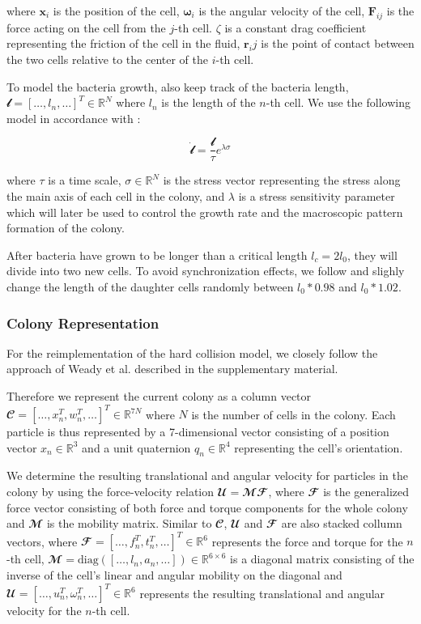 \documentclass[conference]{IEEEtran}
\begin{document}
where $\mathbf{x}_i$ is the position of the cell, $\mathbf{\omega}_i$ is the angular velocity of the cell, $\mathbf{F}_{ij}$ is the force acting on the cell from the $j$-th cell. $\zeta$ is a constant drag coefficient representing the friction of the cell in the fluid, $\mathbf{r}_ij$ is the point of contact between the two cells relative to the center of the $i$-th cell.


To model the bacteria growth, also keep track of the bacteria length, $\mathbfcal{l} = [\dots, l_n, \dots]^T \in \mathbb{R}^{N}$ where $l_n$ is the length of the $n$-th cell. We use the following model in accordance with \cite{Weady2024}:

$$
    \dot{\mathbfcal{l}} =  \frac{\mathbfcal{l}}{\tau} e^{\lambda \mathbfcal{\sigma}}
$$

where $\tau$ is a time scale, $\mathbfcal{\sigma} \in \mathbb{R}^{N}$ is the stress vector representing the stress along the main axis of each cell in the colony, and $\lambda$ is a stress sensitivity parameter which will later be used to control the growth rate and the macroscopic pattern formation of the colony.

After bacteria have grown to be longer than a critical length $l_c = 2l_0$, they will divide into two new cells. To avoid synchronization effects, we follow \cite{Khan_2024} and slighly change the length of the daughter cells randomly between $l_0*0.98$ and $l_0*1.02$.


\subsubsection{Colony Representation}

For the reimplementation of the hard collision model, we closely follow the approach of Weady et al. \cite{Weady2024} described in the supplementary material.

Therefore we represent the current colony as a column vector $\mathbfcal{C} = [\dots, x_n^T, w_n^T, \dots]^T \in \mathbb{R}^{7N}$ where $N$ is the number of cells in the colony. Each particle is thus represented by a 7-dimensional vector consisting of a position vector $x_n \in \mathbb{R}^3$ and a unit quaternion $q_n \in \mathbb{R}^4$ representing the cell's orientation.

We determine the resulting translational and angular velocity for particles in the colony by using the force-velocity relation $\mathbfcal{U} = \mathbfcal{M} \mathbfcal{F}$, where $\mathbfcal{F}$ is the generalized force vector consisting of both force and torque components for the whole colony and $\mathbfcal{M}$ is the mobility matrix. Similar to $\mathbfcal{C}$, $\mathbfcal{U}$ and $\mathbfcal{F}$ are also stacked collumn vectors, where $\mathbfcal{F} = [\dots, f_n^T, t_n^T, \dots]^T \in \mathbb{R}^{6}$ represents the force and torque for the $n$-th cell, $\mathbfcal{M} = \text{diag}([\dots, l_n, a_n, \dots]) \in \mathbb{R}^{6 \times 6}$ is a diagonal matrix consisting of the inverse of the cell's linear and angular mobility on the diagonal and $\mathbfcal{U} = [\dots, u_n^T, \omega_n^T, \dots]^T \in \mathbb{R}^{6}$ represents the resulting translational and angular velocity for the $n$-th cell.
\end{document}
